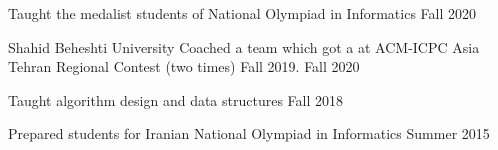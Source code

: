 \begin{cvtas}

  \cvta
    {} %
    {Taught the medalist students of National Olympiad in Informatics} %
    {Fall 2020} %
    {} %

  \cvta
    {Shahid Beheshti University} %
    {Coached a team which got a  at ACM-ICPC Asia Tehran Regional Contest (two times)}
    {Fall 2019. Fall 2020} %
    {} %

  \cvta
    {} %
    {Taught algorithm design and data structures}
    {Fall 2018} %
    {} %





  \cvta
    {} %
    {Prepared students for Iranian National Olympiad in Informatics} %
    {Summer 2015} %
    {} %

\end{cvtas}